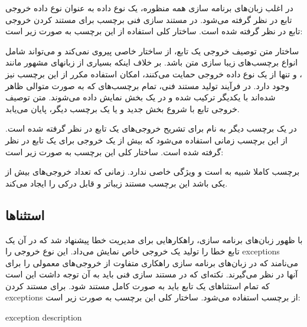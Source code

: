 در اغلب زبان‌های برنامه سازی همه منظوره، یک نوع داده به عنوان نوع داده خروجی تابع
در نظر گرفته می‌شود.
در مستند سازی فنی برچسب  برای مستند کردن خروجی تابع در نظر گرفته شده است.
ساختار کلی استفاده از این برچسب به صورت زیر است:
\begin{C++}
\end{C++}

ساختار متن توصیف خروجی یک تابع، از ساختار خاصی پیروی نمی‌کند و می‌تواند شامل
انواع برچسب‌های زیبا سازی متن باشد.
بر خلاف اینکه بسیاری از زبانهای مشهور مانند ،  و  تنها از 
یک نوع داده خروجی حمایت می‌کنند، امکان استفاده مکرر از این برچسب نیز وجود دارد.
در فرآیند تولید مستند فنی، تمام برچسب‌های  که به صورت متوالی ظاهر شده‌اند
با یکدیگر ترکیب شده و در یک بخش نمایش داده می‌شوند.
متن توصیف خروجی تابع با شروع بخش جدید و یا یک برچسب دیگر، پایان می‌یابد.

در  یک برچسب دیگر به نام  برای تشریح خروجی‌های یک تابع در نظر گرفته شده است.
از این برچسب زمانی استفاده می‌شود که بیش از یک خروجی برای یک تابع در نظر گرفته شده است.
ساختار کلی این برچسب به صورت زیر است:
\begin{C++}
\end{C++}

\begin{note}
برچسب  کاملا شبیه به  است و ویژگی خاصی ندارد. 
زمانی که تعداد خروجی‌های بیش از یکی باشد این برچسب مستند زیباتر و قابل درکی را 
ایجاد می‌کند.
\end{note}

\subsection{استثناها}

با ظهور زبان‌های برنامه سازی، راهکارهایی برای مدیریت خطا پیشنهاد شد که در آن
یک تابع خطا را تولید یک خروجی خاص نمایش می‌داد.
این نوع خروجی را \glspl{exception} می‌نامند که در زبان‌های برنامه سازی راهکاری متفاوت
از خروجی‌های معمولی را برای آنها در نظر می‌گیرند.
نکته‌ای که در مستند سازی فنی باید به آن توجه داشت این است که تمام استثناهای یک
تابع باید به صورت کامل مستند شود.
برای مستند کردن \glspl{exception} از برچسب  استفاده می‌شود.
ساختار کلی این برچسب به صورت زیر است:
\begin{C++}
 { exception description }
\end{C++}

